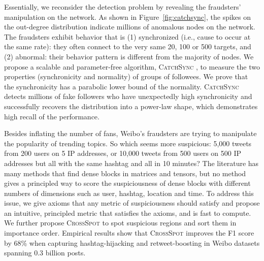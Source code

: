 \documentclass[10.5pt]{article}
\begin{document}
Essentially, we reconsider the detection problem by revealing the fraudsters' manipulation on the network. As shown in Figure~\ref{fig:catchsync}, the spikes on the out-degree distribution indicate millions of anomalous nodes on the network. The fraudsters exhibit behavior that is (1) synchronized (i.e., cause to occur at the same rate): they often connect to the very same 20, 100 or 500 targets, and (2) abnormal: their behavior pattern is different from the majority of nodes. We propose a scalable and parameter-free algorithm, \textsc{CatchSync} \cite{jiang2014catchsync}, to measure the two properties (synchronicity and normality) of groups of followees. We prove that the synchronicity has a parabolic lower bound of the normality. \textsc{CatchSync} detects millions of fake followers who have unexpectedly high synchronicity and successfully recovers the distribution into a power-law shape, which demonstrates high recall of the performance.

 Besides inflating the number of fans, Weibo's fraudsters are trying to manipulate the popularity of trending topics. So which seems more suspicious: 5,000 tweets from 200 users on 5 IP addresses, or 10,000 tweets from 500 users on 500 IP addresses but all with the same hashtag and all in 10 minutes? The literature has many methods that find dense blocks in matrices and tensors, but no method gives a principled way to score the suspiciousness of dense blocks with different numbers of dimensions such as user, hashtag, location and time. To address this issue, we give axioms that any metric of suspiciousness should satisfy and propose an intuitive, principled metric that satisfies the axioms, and is fast to compute. We further propose \textsc{CrossSpot} \cite{jiang2015general} to spot suspicious regions and sort them in importance order. Empirical results show that \textsc{CrossSpot} improves the F1 score by 68\% when capturing hashtag-hijacking and retweet-boosting in Weibo datasets spanning 0.3 billion posts.
\end{document}

